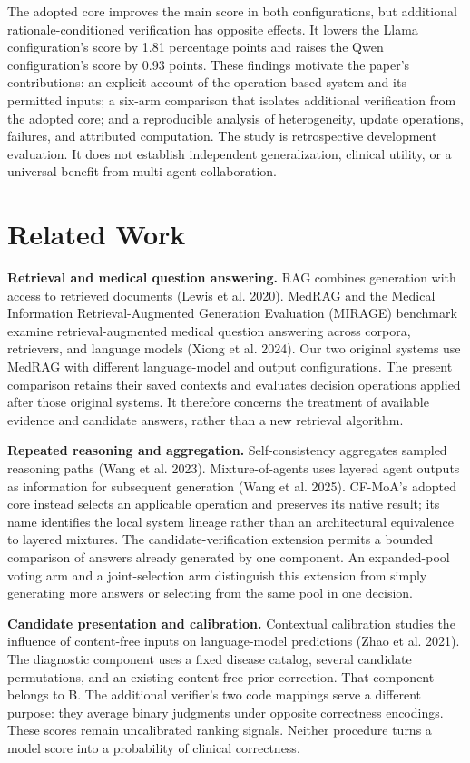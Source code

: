 \documentclass[
  english,
  11pt,
]{article}
\begin{document}
The adopted core improves the main score in both configurations, but
additional rationale-conditioned verification has opposite effects. It
lowers the Llama configuration's score by 1.81 percentage points and
raises the Qwen configuration's score by 0.93 points. These findings
motivate the paper's contributions: an explicit account of the
operation-based system and its permitted inputs; a six-arm comparison
that isolates additional verification from the adopted core; and a
reproducible analysis of heterogeneity, update operations, failures, and
attributed computation. The study is retrospective development
evaluation. It does not establish independent generalization, clinical
utility, or a universal benefit from multi-agent collaboration.

\section{Related Work}\label{related-work}

\textbf{Retrieval and medical question answering.} RAG combines
generation with access to retrieved documents (Lewis et al. 2020).
MedRAG and the Medical Information Retrieval-Augmented Generation
Evaluation (MIRAGE) benchmark examine retrieval-augmented medical
question answering across corpora, retrievers, and language models
(Xiong et al. 2024). Our two original systems use MedRAG with different
language-model and output configurations. The present comparison retains
their saved contexts and evaluates decision operations applied after
those original systems. It therefore concerns the treatment of available
evidence and candidate answers, rather than a new retrieval algorithm.

\textbf{Repeated reasoning and aggregation.} Self-consistency aggregates
sampled reasoning paths (Wang et al. 2023). Mixture-of-agents uses
layered agent outputs as information for subsequent generation (Wang et
al. 2025). CF-MoA's adopted core instead selects an applicable operation
and preserves its native result; its name identifies the local system
lineage rather than an architectural equivalence to layered mixtures.
The candidate-verification extension permits a bounded comparison of
answers already generated by one component. An expanded-pool voting arm
and a joint-selection arm distinguish this extension from simply
generating more answers or selecting from the same pool in one decision.

\textbf{Candidate presentation and calibration.} Contextual calibration
studies the influence of content-free inputs on language-model
predictions (Zhao et al. 2021). The diagnostic component uses a fixed
disease catalog, several candidate permutations, and an existing
content-free prior correction. That component belongs to B. The
additional verifier's two code mappings serve a different purpose: they
average binary judgments under opposite correctness encodings. These
scores remain uncalibrated ranking signals. Neither procedure turns a
model score into a probability of clinical correctness.
\end{document}
